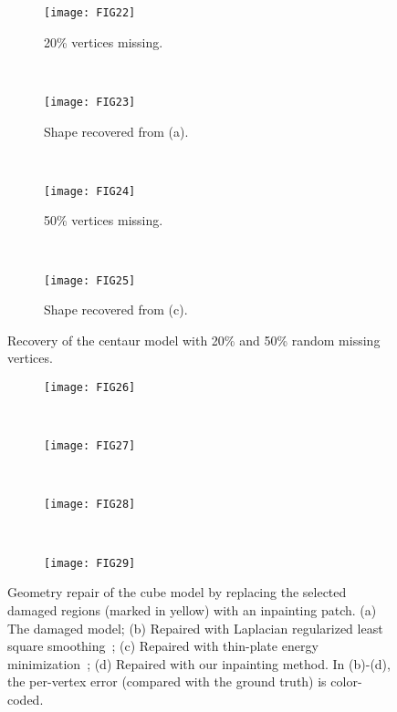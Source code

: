 \begin{figure}
  \centering
    \begin{subfigure}[b]{0.23\linewidth}
        \texttt{[image: FIG22]}
        \caption{20\% vertices missing.}
    \end{subfigure}
    ~
    \begin{subfigure}[b]{0.23\linewidth}
        \texttt{[image: FIG23]}
        \caption{Shape recovered from (a).}
    \end{subfigure}
    ~
    \begin{subfigure}[b]{0.23\linewidth}
        \texttt{[image: FIG24]}
        \caption{50\% vertices missing.}
    \end{subfigure}
    ~
    \begin{subfigure}[b]{0.23\linewidth}
        \texttt{[image: FIG25]}
        \caption{Shape recovered from (c).}
    \end{subfigure}
\caption[Recovery of the centaur model with random missing vertices.]
{Recovery of the centaur model with 20\% and 50\% random missing vertices.}
\label{fig:centaur:recovery}
\end{figure}

\begin{figure}
    \centering
    \begin{subfigure}[b]{0.23\linewidth}
        \texttt{[image: FIG26]}
        \caption{}
    \end{subfigure}%
    ~
    \begin{subfigure}[b]{0.23\linewidth}
        \texttt{[image: FIG27]}
        \caption{}
    \end{subfigure}
    ~
    \begin{subfigure}[b]{0.23\linewidth}
        \texttt{[image: FIG28]}
        \caption{}
    \end{subfigure}
    ~
    \begin{subfigure}[b]{0.23\linewidth}
        \texttt{[image: FIG29]}
        \caption{}
    \end{subfigure}
\caption[Geometry repair of the damaged cube model.]
        {Geometry repair of the cube model by replacing the selected damaged regions (marked in yellow) with an inpainting patch.
         (a) The damaged model; (b) Repaired with Laplacian regularized least square smoothing~\cite{Nealen2006};
         (c) Repaired with thin-plate energy minimization~\cite{Bac2008};
         (d) Repaired with our inpainting method. In (b)-(d), the per-vertex error (compared with the ground truth) is color-coded.}
\label{fig:repair:cube}
\end{figure}

